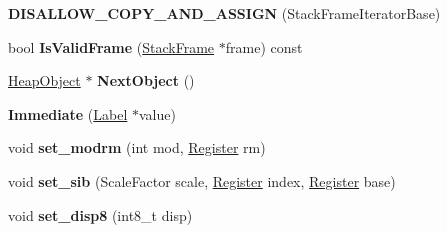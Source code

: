 \begin{DoxyCompactItemize}
\item 
{\bfseries D\+I\+S\+A\+L\+L\+O\+W\+\_\+\+C\+O\+P\+Y\+\_\+\+A\+N\+D\+\_\+\+A\+S\+S\+I\+GN} (Stack\+Frame\+Iterator\+Base)\hypertarget{classv8_1_1internal_1_1_b_a_s_e___e_m_b_e_d_d_e_d_a01483b2e398256ab33e8b134761f0e00}{}\label{classv8_1_1internal_1_1_b_a_s_e___e_m_b_e_d_d_e_d_a01483b2e398256ab33e8b134761f0e00}

\item 
bool {\bfseries Is\+Valid\+Frame} (\hyperlink{classv8_1_1_stack_frame}{Stack\+Frame} $\ast$frame) const \hypertarget{classv8_1_1internal_1_1_b_a_s_e___e_m_b_e_d_d_e_d_a60e2a03297cb8bc99ad55aaec41a8e3a}{}\label{classv8_1_1internal_1_1_b_a_s_e___e_m_b_e_d_d_e_d_a60e2a03297cb8bc99ad55aaec41a8e3a}

\item 
\hyperlink{classv8_1_1internal_1_1_heap_object}{Heap\+Object} $\ast$ {\bfseries Next\+Object} ()\hypertarget{classv8_1_1internal_1_1_b_a_s_e___e_m_b_e_d_d_e_d_a419f88d9c5c0f5f59f61e5f840d09841}{}\label{classv8_1_1internal_1_1_b_a_s_e___e_m_b_e_d_d_e_d_a419f88d9c5c0f5f59f61e5f840d09841}

\item 
{\bfseries Immediate} (\hyperlink{classv8_1_1internal_1_1_label}{Label} $\ast$value)\hypertarget{classv8_1_1internal_1_1_b_a_s_e___e_m_b_e_d_d_e_d_af352d671553f37a70486a9e3d8689d87}{}\label{classv8_1_1internal_1_1_b_a_s_e___e_m_b_e_d_d_e_d_af352d671553f37a70486a9e3d8689d87}

\item 
void {\bfseries set\+\_\+modrm} (int mod, \hyperlink{structv8_1_1internal_1_1_register}{Register} rm)\hypertarget{classv8_1_1internal_1_1_b_a_s_e___e_m_b_e_d_d_e_d_ace658f04f71eed9f994b61f21c0c0ee1}{}\label{classv8_1_1internal_1_1_b_a_s_e___e_m_b_e_d_d_e_d_ace658f04f71eed9f994b61f21c0c0ee1}

\item 
void {\bfseries set\+\_\+sib} (Scale\+Factor scale, \hyperlink{structv8_1_1internal_1_1_register}{Register} index, \hyperlink{structv8_1_1internal_1_1_register}{Register} base)\hypertarget{classv8_1_1internal_1_1_b_a_s_e___e_m_b_e_d_d_e_d_ae6887796d6bc73446687e94e203e6544}{}\label{classv8_1_1internal_1_1_b_a_s_e___e_m_b_e_d_d_e_d_ae6887796d6bc73446687e94e203e6544}

\item 
void {\bfseries set\+\_\+disp8} (int8\+\_\+t disp)\hypertarget{classv8_1_1internal_1_1_b_a_s_e___e_m_b_e_d_d_e_d_a95f6bf36f139832e17f7629908c8c99e}{}\label{classv8_1_1internal_1_1_b_a_s_e___e_m_b_e_d_d_e_d_a95f6bf36f139832e17f7629908c8c99e}


\end{DoxyCompactItemize}
